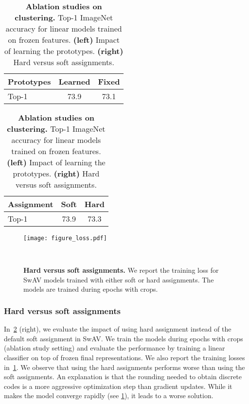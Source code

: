 \documentclass{article}
\def\OURS{SwAV\xspace}
\begin{document}
\begin{table}[h]
  \caption{
\textbf{Ablation studies on clustering.} Top-1 ImageNet accuracy for linear models trained on frozen features.
\textbf{(left)} Impact of learning the prototypes.
\textbf{(right)} Hard versus soft assignments.
}
\label{tab:learned_soft}
\vspace{.3em}
\begin{minipage}{0.5\linewidth}
\centering
\begin{tabular}{l c c}
    \toprule
	  Prototypes & Learned & Fixed \\
    \midrule
	Top-1 & 73.9 & 73.1 \\
    \bottomrule
  \end{tabular}
\end{minipage}
\begin{minipage}{0.5\linewidth}
\begin{tabular}{l c c}
    \toprule
	  Assignment & Soft & Hard \\
    \midrule
	Top-1 & 73.9 & 73.3 \\
    \bottomrule
  \end{tabular}
\end{minipage}
\end{table}

\begin{figure}[b]
\begin{minipage}{0.48\linewidth}
\centering
\texttt{[image: figure\_loss.pdf]}
\end{minipage}
~~~~~\begin{minipage}{0.48\linewidth}
\caption{\textbf{Hard versus soft assignments.}
We report the training loss for \OURS models trained with either soft or hard assignments.
The models are trained during  epochs with  crops.
}
\label{fig:losssoft}
\end{minipage}
\end{figure}

\subsubsection{Hard versus soft assignments}
In~\cref{tab:learned_soft} (right), we evaluate the impact of using hard assignment instead of the default soft assignment in \OURS.
We train the models during  epochs with  crops (ablation study setting) and evaluate the performance by training a linear classifier on top of frozen final representations.
We also report the training losses in~\cref{fig:losssoft}.
We observe that using the hard assignments performs worse than using the soft assignments.
An explanation is that the rounding needed to obtain discrete codes is a more aggressive optimization step than gradient updates.
While it makes the model converge rapidly (see \cref{fig:losssoft}), it leads to a worse solution.
\end{document}
